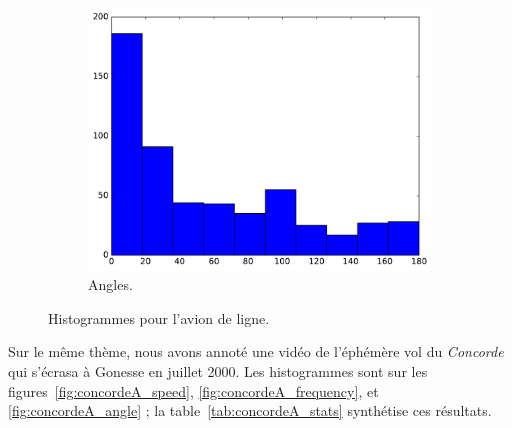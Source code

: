 \begin{figure}[htb]
\begin{subfigure}[t]{\subImgWclicks}
			\includegraphics[width=\textwidth]{figures/ch3/chinaA_angle}
			\caption{Angles.}
			\label{fig:chinaA_angle}
		\end{subfigure}
		\caption[Histogrammes pour l'avion de ligne]{Histogrammes pour l'avion de ligne.}
		\label{fig:histChina}
	\end{figure}

	Sur le même thème, nous avons annoté une vidéo de l'éphémère vol du \emph{Concorde} qui s'écrasa à Gonesse en juillet 2000\footnotemark{}. Les histogrammes sont sur les figures~\ref{fig:concordeA_speed}, \ref{fig:concordeA_frequency}, et \ref{fig:concordeA_angle} ; la table~\ref{tab:concordeA_stats} synthétise ces résultats.
		

